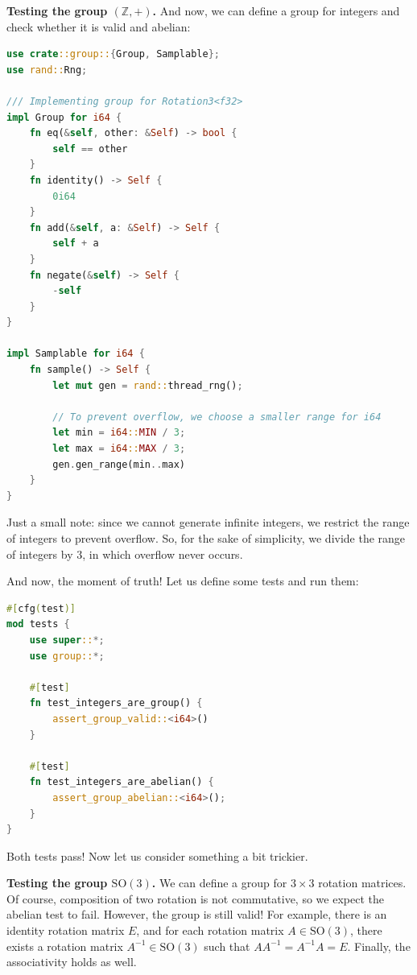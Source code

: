 \documentclass[../lecture-notes.tex]{subfiles}
\begin{document}
\textbf{Testing the group $(\mathbb{Z}, +)$.} And now, we can define a group for integers and check whether it is valid and abelian:
\begin{lstlisting}[language=Rust]
use crate::group::{Group, Samplable};
use rand::Rng;

/// Implementing group for Rotation3<f32>
impl Group for i64 {
    fn eq(&self, other: &Self) -> bool {
        self == other
    }
    fn identity() -> Self {
        0i64
    }
    fn add(&self, a: &Self) -> Self {
        self + a
    }
    fn negate(&self) -> Self {
        -self
    }
}

impl Samplable for i64 {
    fn sample() -> Self {
        let mut gen = rand::thread_rng();

        // To prevent overflow, we choose a smaller range for i64
        let min = i64::MIN / 3; 
        let max = i64::MAX / 3;
        gen.gen_range(min..max)
    }
}
\end{lstlisting}

Just a small note: since we cannot generate infinite integers, we restrict the range of integers to prevent overflow. So, 
for the sake of simplicity, we divide the range of integers by $3$, in which overflow never occurs.

And now, the moment of truth! Let us define some tests and run them:
\begin{lstlisting}[language=Rust]
#[cfg(test)]
mod tests {
    use super::*;
    use group::*;

    #[test]
    fn test_integers_are_group() {
        assert_group_valid::<i64>()
    }

    #[test]
    fn test_integers_are_abelian() {
        assert_group_abelian::<i64>();
    }
}
\end{lstlisting}

Both tests pass! Now let us consider something a bit trickier.

\textbf{Testing the group $\text{SO}(3)$.} We can define a group for $3 \times 3$ rotation matrices. Of course, composition of two rotation is not commutative, so we expect the abelian test to fail. However,
the group is still valid! For example, there is an identity rotation matrix $E$, and for each rotation matrix $A \in \text{SO}(3)$, there exists a rotation matrix $A^{-1} \in \text{SO}(3)$ such that $AA^{-1} = A^{-1}A = E$. Finally,
the associativity holds as well.
\end{document}
